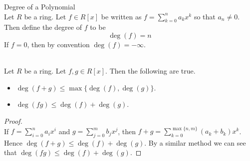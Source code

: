 \documentclass[a4paper]{article}
\begin{document}
\begin{defn}{Degree of a Polynomial}{}\\
Let $R$ be a ring. Let $f\in R[x]$ be written as $f=\sum_{k=0}^n a_kx^k$ so that $a_n\neq 0$. Then define the degree of $f$ to be $$\deg(f)=n$$ If $f=0$, then by convention $\deg(f)=-\infty$. 
\end{defn}

\begin{lmm}{}{}\\
Let $R$ be a ring. Let $f,g\in R[x]$. Then the following are true. 
\begin{itemize}
\item $\deg(f+g)\leq\max\{\deg(f),\deg(g)\}$. 
\item $\deg(fg)\leq\deg(f)+\deg(g)$. 
\end{itemize}
\begin{proof}\\
If $f=\sum_{i=0}^na_ix^i$ and $g=\sum_{j=0}^mb_jx^j$, then $f+g=\sum_{k=0}^{\max\{n,m\}}(a_k+b_k)x^k$. Hence $\deg(f+g)\leq\deg(f)+\deg(g)$. By a similar method we can see that $\deg(fg)\leq\deg(f)+\deg(g)$. 
\end{proof}
\end{lmm}
\end{document}
